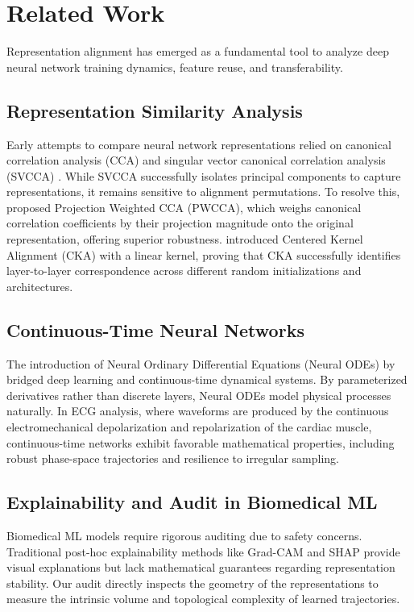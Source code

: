 \documentclass[twocolumn]{article}
\begin{document}
\section{Related Work}
\label{sec:related}
Representation alignment has emerged as a fundamental tool to analyze deep neural network training dynamics, feature reuse, and transferability. 

\subsection{Representation Similarity Analysis}
Early attempts to compare neural network representations relied on canonical correlation analysis (CCA) and singular vector canonical correlation analysis (SVCCA) \citep{raghu2017svcca}. While SVCCA successfully isolates principal components to capture representations, it remains sensitive to alignment permutations. To resolve this, \citet{morcos2018pwcca} proposed Projection Weighted CCA (PWCCA), which weighs canonical correlation coefficients by their projection magnitude onto the original representation, offering superior robustness. \citet{kornblith2019similarity} introduced Centered Kernel Alignment (CKA) with a linear kernel, proving that CKA successfully identifies layer-to-layer correspondence across different random initializations and architectures.

\subsection{Continuous-Time Neural Networks}
The introduction of Neural Ordinary Differential Equations (Neural ODEs) by \citet{chen2018neural} bridged deep learning and continuous-time dynamical systems. By parameterized derivatives rather than discrete layers, Neural ODEs model physical processes naturally. In ECG analysis, where waveforms are produced by the continuous electromechanical depolarization and repolarization of the cardiac muscle, continuous-time networks exhibit favorable mathematical properties, including robust phase-space trajectories and resilience to irregular sampling.

\subsection{Explainability and Audit in Biomedical ML}
Biomedical ML models require rigorous auditing due to safety concerns. Traditional post-hoc explainability methods like Grad-CAM and SHAP provide visual explanations but lack mathematical guarantees regarding representation stability. Our audit directly inspects the geometry of the representations to measure the intrinsic volume and topological complexity of learned trajectories.
\end{document}
